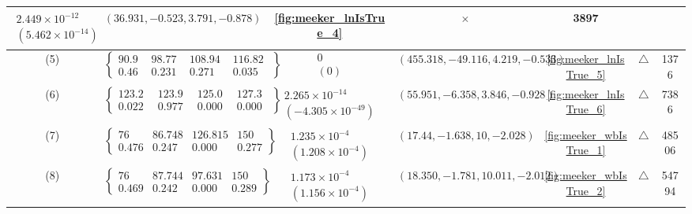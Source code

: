 \begin{table}[H]
\begin{adjustwidth}{-2.5cm}{-2.5cm}
{\begin{tabular}{|c|c|c|c|c|c|c|}
$\begin{array}{c}
2.449\times 10^{-12} \\
(5.462\times 10^{-14})
\end{array}$ & 
$(36.931, -0.523, 3.791, -0.878)$ & 
\ref{fig:meeker_lnIsTrue_4} & $\times$ & 3897 \\
\hline
(5) & $\left\{\begin{array}{cccc}
90.99 & 98.775 & 108.941 & 116.822 \\
0.464 & 0.231 & 0.271 & 0.035
\end{array}\right\}$ &
$\begin{array}{c}
0 \\
(0)
\end{array}$ & 
$(455.318, -49.116, 4.219, -0.533)$ & 
\ref{fig:meeker_lnIsTrue_5} & $\triangle$ & 1376 \\
\hline
(6) & $\left\{\begin{array}{cccc}
123.238 & 123.969 & 125.026 & 127.373 \\
0.022 & 0.977 & 0.000 & 0.000
\end{array}\right\}$ &
$\begin{array}{c}
2.265\times 10^{-14} \\
(-4.305\times 10^{-49})
\end{array}$ & 
$(55.951, -6.358, 3.846, -0.928)$ & 
\ref{fig:meeker_lnIsTrue_6} & $\triangle$ & 7386 \\
\hline
(7) & $\left\{\begin{array}{cccc}
76 & 86.748 & 126.815 & 150 \\
0.476 & 0.247 & 0.000 & 0.277
\end{array}\right\}$ &
$\begin{array}{c}
1.235\times 10^{-4} \\
(1.208\times 10^{-4})
\end{array}$ & 
$(17.44, -1.638, 10, -2.028)$ & 
\ref{fig:meeker_wbIsTrue_1} & $\triangle$ & 48506 \\
\hline
(8) & $\left\{\begin{array}{cccc}
76 & 87.744 & 97.631 & 150 \\
0.469 & 0.242 & 0.000 & 0.289
\end{array}\right\}$ &
$\begin{array}{c}
1.173\times 10^{-4} \\
(1.156\times 10^{-4})
\end{array}$ & 
$(18.350, -1.781, 10.011, -2.012)$ & 
\ref{fig:meeker_wbIsTrue_2} & $\triangle$ & 54794 \\

\end{tabular}}
\end{adjustwidth}
\end{table}
